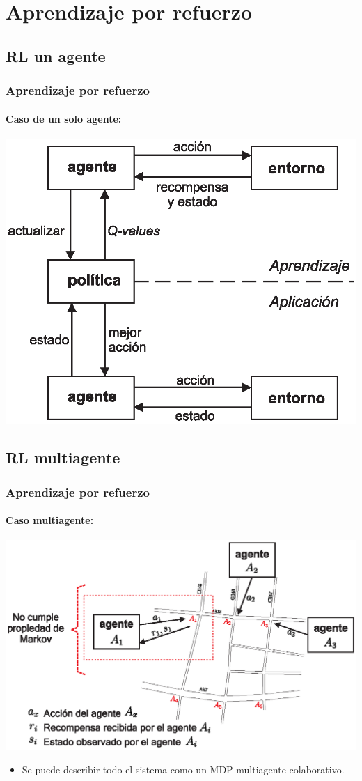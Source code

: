 \documentclass[11pt]{beamer}
\begin{document}
\section{Aprendizaje por refuerzo}
\subsection{RL un agente}
\begin{frame}
\frametitle{Aprendizaje por refuerzo}
\framesubtitle{Caso de un solo agente:}
\begin{center}
\includegraphics[scale=0.55]{./graficas/singleRL2.eps}
\end{center}
\end{frame}

\subsection{RL multiagente}
\begin{frame}
\frametitle{Aprendizaje por refuerzo}
\framesubtitle{Caso multiagente:}
\centering
\includegraphics[scale=0.65]{./graficas/multiRL2.eps}
\begin{itemize}
\item Se puede describir todo el sistema como un MDP multiagente colaborativo.
\end{itemize}
\end{frame}
\end{document}
